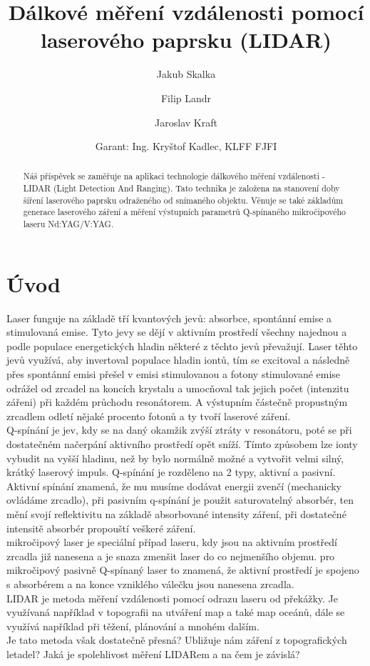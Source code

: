 \documentclass[12pt,a4paper]{article}
\title{Dálkové měření vzdálenosti pomocí laserového paprsku (LIDAR)}
\author[1]{Jakub Skalka}
\author[2]{Filip Landr}
\author[3]{Jaroslav Kraft}
\date{\small Garant: Ing. Kryštof Kadlec, KLFF FJFI\vspace{-2em}} %
\affil[1]{Gymnázium, České Budějovice, Jírovcova 8; skalkaj@jirovcovka.net}
\affil[2]{Gymnázium, Praha 5, Nad Kavalírkou 100/1; fi.landr@seznam.cz}
\affil[3]{Gymnázium Příbram, Legionářů 402; kraft.jarda@gmail.com\vspace{-1em}} %
\begin{document}
\maketitle \thispagestyle{empty}

\begin{abstract} \noindent
    Náš příspěvek se zaměřuje na aplikaci technologie dálkového měření vzdálenosti - LIDAR (Light Detection And Ranging). Tato technika je založena na stanovení doby šíření laserového paprsku odraženého od snímaného objektu. Věnuje se také základům generace laserového záření a měření výstupních parametrů Q-spínaného mikročipového laseru Nd:YAG/V:YAG.\end{abstract}


\section{Úvod}
Laser funguje na základě tří kvantových jevů: absorbce, spontánní emise a stimulovaná emise. Tyto jevy se dějí v aktivním prostředí všechny najednou a podle populace energetických hladin některé z těchto jevů převažují. Laser těhto jevů využívá, aby invertoval populace hladin iontů, tím se excitoval a následně přes spontánní emisi přešel v emisi stimulovanou a fotony stimulované emise odrážel od zrcadel na koncích krystalu a umocňoval tak jejich počet (intenzitu zářeni) při každém průchodu resonátorem. A výstupním částečně propustným zrcadlem odletí nějaké procento fotonů a ty tvoří laserové záření.
\\Q-spínání je jev, kdy se na daný okamžik zvýší ztráty v resonátoru, poté se při dostatečném načerpání aktivního prostředí opět sníží. Tímto způsobem lze ionty vybudit na vyšší hladinu, než by bylo normálně možné a vytvořit velmi silný, krátký laserový impuls. Q-spínání je rozděleno na 2 typy, aktivní a pasivní. Aktivní spínání znamená, že mu musíme dodávat energii zvenčí (mechanicky ovládáme zrcadlo), při pasivním q-spínání je použit saturovatelný absorbér, ten mění svojí reflektivitu na základě absorbované intensity záření, při dostatečné intensitě absorbér propouští veškeré záření.
\\mikročipový laser je speciální případ laseru, kdy jsou na aktivním prostředí zrcadla již nanesena a je snaza zmenšit laser do co nejmenšího objemu. pro mikročipový pasivně Q-spínaný laser to znamená, že aktivní prostředí je spojeno s absorbérem a na konce vzniklého válečku jsou nanesena zrcadla.
\\LIDAR je metoda měření vzdálenosti pomocí odrazu laseru od překážky. Je využívaná například v topografii na utváření map a také map oceánů, dále se využívá například při těžení, plánování a mnohém dalším.
\\Je tato metoda však dostatečně přesná? Ubližuje nám záření z topografických letadel? Jaká je spolehlivost měření LIDARem a na čem je závislá?
\end{document}
